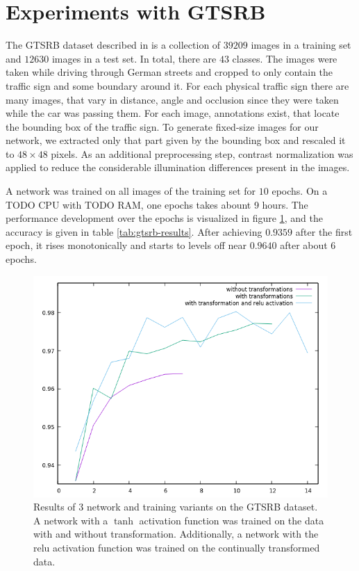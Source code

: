 \documentclass[11pt, a4paper]{article}
\begin{document}
\section{Experiments with GTSRB}
The GTSRB dataset described in \cite{gtsrb} is a collection of $39209$ images in a training set and $12630$ images in a test set. In total, there are $43$ classes. The images were taken while driving through German streets and cropped to only contain the traffic sign and some boundary around it. For each physical traffic sign there are many images, that vary in distance, angle and occlusion since they were taken while the car was passing them. For each image, annotations exist, that locate the bounding box of the traffic sign. To generate fixed-size images for our network, we extracted only that part given by the bounding box and rescaled it to $48\times48$ pixels. As an additional preprocessing step, contrast normalization was applied to reduce the considerable illumination differences present in the images.

A network was trained on all images of the training set for $10$ epochs. On a TODO CPU with TODO RAM, one epochs takes abount 9 hours. The performance development over the epochs is visualized in figure \ref{fig:gtsrb-results}, and the accuracy is given in table \ref{tab:gtsrb-results}. After achieving $0.9359$ after the first epoch, it rises monotonically and starts to levels off near $0.9640$ after about 6 epochs.

\begin{figure}[h!]
	\centering
	\includegraphics[width=1\textwidth]{gtsrb_results}
	\caption{Results of 3 network and training variants on the GTSRB dataset. A network with a $\tanh$ activation function was trained on the data with and without transformation. Additionally, a network with the relu activation function was trained on the continually transformed data.}
	\label{fig:gtsrb-results}
\end{figure}
\end{document}
